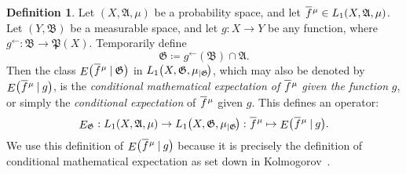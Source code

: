 \documentclass[
twoside=true,
paper=letter,
fontsize=9pt,
pagesize=auto,
leqno,
openany,
headsepline,
overfullrule,
]{scrbook}
\theoremstyle{plain}
\theoremstyle{plain}
\theoremstyle{definition}
\newtheorem{defn}[thm]{Definition}
\theoremstyle{bfnoteitalic}
\theoremstyle{bfnoteroman}
\newcommand{\sigalg}[1]{\mathfrak{#1}}
\newcommand{\definedby}{\coloneqq}
\newcommand{\given}{\mathbin{\vert}}
\newcommand{\kondexpgvn}[2]
{\mathop{E}\bigl(#1\given#2\bigr)}
\newcommand{\kondexpop}{\mathop{E}}
\newcommand{\restrictedto}[1]{_{\lvert#1}\kern-1.5pt}
\newcommand{\preimage}[1]{#1^{\leftarrow}}
\newcommand{\meets}{\cap}
\newcommand{\sigmaalgebra}{\sigalg{A}}
\newcommand{\sigmaalgebraii}{\sigalg{B}}
\newcommand{\powerset}{\mathfrak{P}}
\newcommand{\function}{f}
\newcommand{\functionii}{g}
\newcommand{\measurespace}{X}
\newcommand{\measurespaceii}{Y}
\newcommand{\measure}{\mu}
\newcommand*\xbar[1]{%
   \hbox{%
     \vbox{%
       \hrule height 0.4pt %
       \kern0.4ex%
       \hbox{%
         \ensuremath{#1}%
       }%
     }%
   }%
}
\newcommand{\lebclass}[1]{\hspace{.5pt}\xbar{#1}\hspace{0.5pt}}
\newcommand{\ellclass}[2]{\lebclass{#1}^{#2}}
\begin{document}
\begin{defn}\label{cme_function}
Let $(\measurespace, \sigmaalgebra,\measure)$ be a probability space, and let
$\ellclass{\function}{\measure}\in L_1(\measurespace, \sigmaalgebra,\measure)$.
Let $(\measurespaceii, \sigmaalgebraii)$ be a measurable space, and let $\functionii:\measurespace\to\measurespaceii$ be any function, where $\preimage{\functionii}:\sigmaalgebraii\to\powerset(\measurespace)$.
Temporarily define
\[
\sigalg{G}\definedby
\preimage{\functionii}(\sigmaalgebraii)\meets\sigmaalgebra.
\]
Then the class 
$\kondexpgvn{\ellclass{\function}{\measure}}{\sigalg{G}}$
in
$L_1\bigl(\measurespace, \sigalg{G},\measure\restrictedto{\sigalg{G}}\bigr)$, 
which may also be denoted by
$\kondexpgvn{\ellclass{\function}{\measure}}{\functionii}$, is the \emph{conditional mathematical expectation of} $\ellclass{\function}{\measure}$ \emph{given the function} $\functionii$, or simply the \emph{conditional expectation} of $\ellclass{\function}{\measure}$ given $\functionii$. This defines an operator:
\[
\kondexpop\nolimits_{\sigalg{G}}
:
L_1(\measurespace, \sigmaalgebra,\measure) \to
L_1\bigl(\measurespace, 
\sigalg{G},
\measure\restrictedto{\sigalg{G}}
\bigr):
\ellclass{\function}{\measure}\mapsto \kondexpgvn{\ellclass{\function}{\measure}}{\functionii}.
\]
We use this definition of $\kondexpgvn{\ellclass{\function}{\measure}}{\functionii}$ because it is precisely the definition of conditional mathematical expectation as set down in Kolmogorov~\cite{fottop_kolmogorov_1956}. 


\end{defn}
\end{document}
